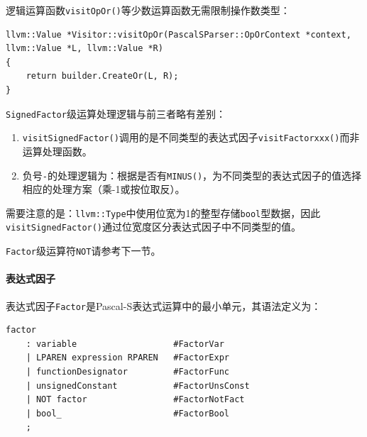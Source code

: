 \documentclass[lang=cn,11pt,a4paper,cite=authornum]{paper}
\begin{document}
逻辑运算函数\texttt{visitOpOr()}等少数运算函数无需限制操作数类型：

\begin{code}
\begin{verbatim}
llvm::Value *Visitor::visitOpOr(PascalSParser::OpOrContext *context, llvm::Value *L, llvm::Value *R)
{
    return builder.CreateOr(L, R);
}
\end{verbatim}
\end{code}

\texttt{SignedFactor}级运算处理逻辑与前三者略有差别：

\begin{enumerate}
    \item \texttt{visitSignedFactor()}调用的是不同类型的表达式因子\texttt{visitFactorxxx()}而非运算处理函数。
    \item 负号\texttt{-}的处理逻辑为：根据是否有\texttt{MINUS()}，为不同类型的表达式因子的值选择相应的处理方案（乘-1或按位取反）。
\end{enumerate}

需要注意的是：\texttt{llvm::Type}中使用位宽为1的整型存储\texttt{bool}型数据，因此\texttt{visitSignedFactor()}通过位宽度区分表达式因子中不同类型的值。

\texttt{Factor}级运算符\texttt{NOT}请参考下一节。

\paragraph{表达式因子}

表达式因子\texttt{Factor}是Pascal-S表达式运算中的最小单元，其语法定义为：

\begin{code}
\begin{verbatim}
factor
    : variable                   #FactorVar
    | LPAREN expression RPAREN   #FactorExpr
    | functionDesignator         #FactorFunc
    | unsignedConstant           #FactorUnsConst
    | NOT factor                 #FactorNotFact
    | bool_                      #FactorBool
    ;
\end{verbatim}
\end{code}
\end{document}
